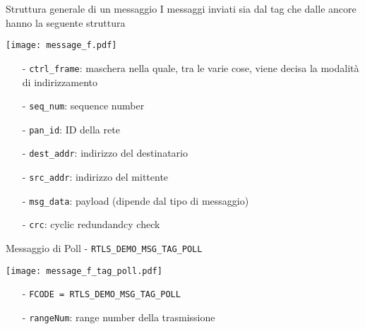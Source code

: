 \begin{frame}{Struttura generale di un messaggio}
  I messaggi inviati sia dal tag che dalle ancore hanno la seguente struttura
  \begin{center}
    \texttt{[image: message\_f.pdf]}
  \end{center}
  \begin{itemize}
  \item[-] \lstinline!ctrl_frame!: maschera nella quale, tra le varie cose, viene decisa la modalità di
    indirizzamento
  \item[-] \lstinline!seq_num!: sequence number
  \item[-] \lstinline!pan_id!: ID della rete
  \item[-] \lstinline!dest_addr!: indirizzo del destinatario
  \item[-] \lstinline!src_addr!: indirizzo del mittente
  \item[-] \lstinline!msg_data!: payload (dipende dal tipo di messaggio)
  \item[-] \lstinline!crc!: cyclic redundandcy check
  \end{itemize}
\end{frame}

\begin{frame}{Messaggio di Poll - \lstinline!RTLS_DEMO_MSG_TAG_POLL!}
  \begin{center}
    \texttt{[image: message\_f\_tag\_poll.pdf]}
  \end{center}
  \begin{itemize}
  \item[-] \lstinline!FCODE = RTLS_DEMO_MSG_TAG_POLL!
  \item[-] \lstinline!rangeNum!: range number della trasmissione
  \end{itemize}
\end{frame}


